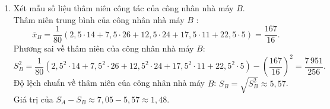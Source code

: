 \begin{ex}
{\begin{enumerate}[$\bullet$]
			Thâm niên trung bình của công nhân nhà máy $A$ :
			$$\overline{x}_A=\dfrac{1}{80}\left(2{,}5\cdot 35+7{,}5\cdot 13+12{,}5\cdot 12+17{,}5\cdot 12+22{,}5\cdot8\right)=\dfrac{145}{16}.$$
			Phương sai về thâm niên của công nhân nhà máy $A$: $$S_A^2=\dfrac{1}{80}\left(2{,}5^2\cdot 35+7{,}5^2\cdot 13+12{,}5^2\cdot 12+17{,}5^2\cdot 12+22{,}5^2\cdot8\right)-\left(\dfrac{145}{16}\right)^2 =\dfrac{12\,735}{256}.$$
			Độ lệch chuẩn  về thâm niên của công nhân nhà máy $A$: $S_A=\sqrt{S_A^2}\approx 7{,}05$.
			\item Xét mẫu số liệu thâm niên công tác của công nhân nhà máy $B$.\\
			Thâm niên trung bình của công nhân nhà máy $B$ :
			$$\overline{x}_B=\dfrac{1}{80}\left(2{,}5\cdot 14+7{,}5\cdot 26+12{,}5\cdot 24+17{,}5\cdot 11+22{,}5\cdot5\right)=\dfrac{167}{16}.$$
			Phương sai về thâm niên của công nhân nhà máy $B$: $$S_B^2=\dfrac{1}{80}\left(2{,}5^2\cdot 14+7{,}5^2\cdot 26+12{,}5^2\cdot 24+17{,}5^2\cdot 11+22{,}5^2\cdot 5\right)-\left(\dfrac{167}{16}\right)^2 =\dfrac{7\,951}{256}.$$
			Độ lệch chuẩn  về thâm niên của công nhân nhà máy $B$: $S_B=\sqrt{S_B^2}\approx 5{,}57$.\\
			Giá trị của $S_A-S_B\approx 7{,}05-5{,}57\approx 1{,}48$.
		\end{enumerate}
	}
\end{ex}

